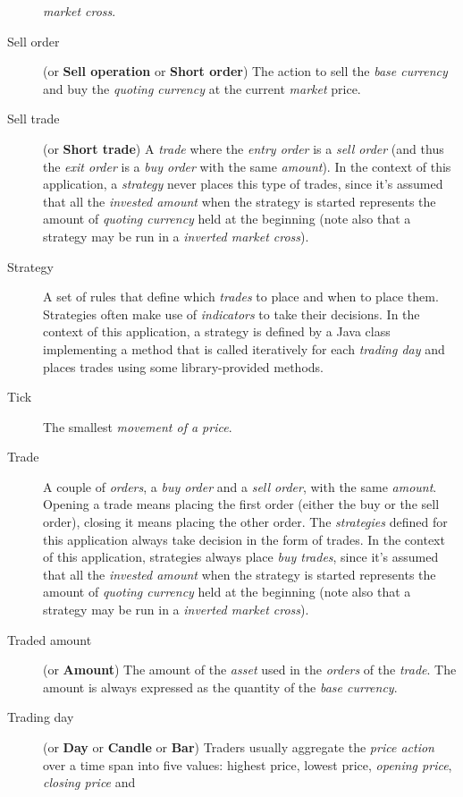 \begin{description}
		\textit{market cross}.
	\item[Sell order] (or \textbf{Sell operation} or \textbf{Short order})
		The action to sell the \textit{base currency} and buy the
		\textit{quoting currency} at the current \textit{market} price.
	\item[Sell trade] (or \textbf{Short trade}) A \textit{trade} where the
		\textit{entry order} is a \textit{sell order} (and thus the
		\textit{exit order} is a \textit{buy order} with the same
		\textit{amount}). In the context of this application, a
		\textit{strategy} never places this type of trades, since it's
		assumed that all the \textit{invested amount} when the strategy
		is started represents the amount of \textit{quoting currency}
		held at the beginning (note also that a strategy may be run in a
		\textit{inverted market cross}).
	\item[Strategy] A set of rules that define which \textit{trades} to
		place and when to place them. Strategies often make use of
		\textit{indicators} to take their decisions. In the context of
		this application, a strategy is defined by a Java class
		implementing a method that is called iteratively for each
		\textit{trading day} and places trades using some
		library-provided methods.
	\item[Tick] The smallest \textit{movement of a price}.
	\item[Trade] A couple of \textit{orders}, a \textit{buy order} and a
		\textit{sell order}, with the same \textit{amount}. Opening a
		trade means placing the first order (either the buy or the sell
		order), closing it means placing the other order. The
		\textit{strategies} defined for this application always take
		decision in the form of trades. In the context of this
		application, strategies always place \textit{buy trades}, since
		it's assumed that all the \textit{invested amount} when the
		strategy is started represents the amount of \textit{quoting
		currency} held at the beginning (note also that a strategy may
		be run in a \textit{inverted market cross}).
	\item[Traded amount] (or \textbf{Amount}) The amount of the
		\textit{asset} used in the \textit{orders} of the
		\textit{trade}. The amount is always expressed as the quantity
		of the \textit{base currency}.
	\item[Trading day] (or \textbf{Day} or \textbf{Candle} or \textbf{Bar})
		Traders usually aggregate the \textit{price action} over a time
		span into five values: highest price, lowest price,
		\textit{opening price}, \textit{closing price} and

\end{description}
